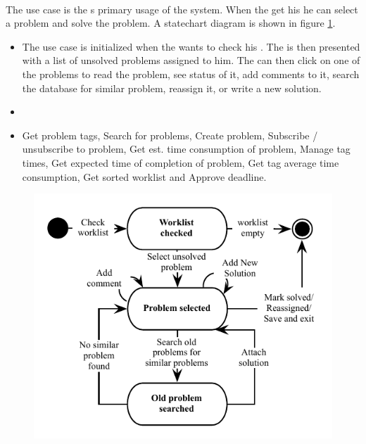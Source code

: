 \paragraph{\ucsolproblem[c]} The use case \ucsolproblem{} is the \astaff{}s primary usage of the system. When the \astaff[] get his \todolist[] he can select a problem and solve the problem. A statechart diagram is shown in figure \ref{fig:solve_problem_use_case}.

\begin{itemize}
\item {} The use case is initialized when the \astaff[] wants to check his \todolist[]. The \astaff[] is then presented with a list of unsolved problems assigned to him. The \astaff[] can then click on one of the problems to read the problem, see status of it, add comments to it, search the database for similar problem, reassign it, or write a new solution. 

\item {}

\item {}Get problem tags, Search for problems, Create problem, Subscribe / unsubscribe to problem, Get est. time consumption of problem, Manage tag times, Get expected time of completion of problem, Get tag average time consumption, Get sorted worklist and Approve deadline. 
\end{itemize}

\begin{figure}[htbp]
\begin{center}
 \includegraphics[scale=0.8]{input/application_domain_analysis/solve_problem_use_case}
\label{fig:solve_problem_use_case}
\end{center}
\end{figure}

